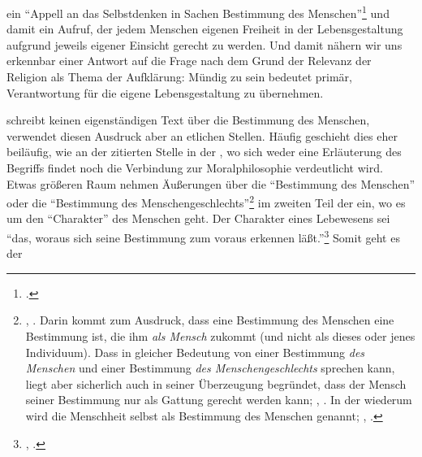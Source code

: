 ein \enquote{Appell an das Selbstdenken in Sachen Bestimmung des
Menschen}\footnote{\cite[][13]{Schwaiger:ZurFragenachdenQuellenvonSpaldingsemphBestimmungdesMenschen1999}.}
und damit ein Aufruf, der jedem Menschen eigenen Freiheit in der
Lebensgestaltung aufgrund jeweils eigener Einsicht gerecht zu werden. Und damit
nähern wir uns erkennbar einer Antwort auf die Frage nach dem Grund der Relevanz
der Religion als Thema der Aufklärung: Mündig zu sein bedeutet primär,
Verantwortung für die eigene Lebensgestaltung zu übernehmen.
 
 
 schreibt keinen eigenständigen Text über die Bestimmung des
Menschen, verwendet diesen Ausdruck aber an etlichen Stellen. Häufig geschieht dies eher
beiläufig, wie an der zitierten Stelle in der , wo sich weder eine Erläuterung des Begriffs findet noch die Verbindung zur
Moralphilosophie verdeutlicht
wird. Etwas größeren Raum nehmen Äußerungen über
die \enquote{Bestimmung des Menschen} oder die \enquote{Bestimmung des
Menschengeschlechts}\footnote{\cite[][B
330]{Kant:AnthropologieinpragmatischerHinsicht1977}, \cite[][VII:
331.28]{Kant:GesammelteWerke1900ff.}. Darin kommt zum Ausdruck, dass eine Bestimmung des Menschen eine Bestimmung ist, die ihm \emph{als Mensch} zukommt
(und nicht als dieses oder jenes Individuum). Dass  in
gleicher Bedeutung von einer Bestimmung \emph{des Menschen} und einer Bestimmung
\emph{des Menschengeschlechts} sprechen kann, liegt aber sicherlich auch in
seiner Überzeugung begründet, dass der Mensch seiner Bestimmung nur als Gattung gerecht
werden kann; \cite[vgl.][A
388]{Kant:IdeezueinerallgemeinenGeschichteinweltbuergerlicherAbsicht1977},
\cite[][VIII: 18.29--32]{Kant:GesammelteWerke1900ff.}. In der 
wiederum wird die Menschheit selbst als Bestimmung des Menschen genannt;
\cite[vgl.][A 3]{Kant:UeberPaedagogik1977}, \cite[][IX:
442.3--4]{Kant:GesammelteWerke1900ff.}.} im zweiten Teil der
 ein, wo es um den
\enquote{Charakter} des Menschen geht. Der Charakter eines Lebewesens sei
\enquote{das, woraus sich seine Bestimmung zum voraus erkennen
läßt.}\footnote{\cite[B~326]{Kant:AnthropologieinpragmatischerHinsicht1977},
\cite[VII: 329.14--15]{Kant:GesammelteWerke1900ff.}.} Somit geht es der
